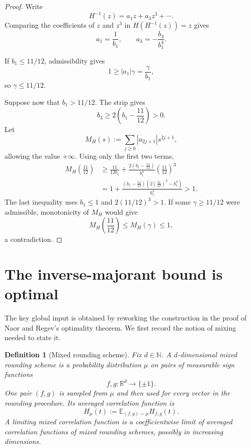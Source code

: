 \documentclass[11pt]{article}
\newtheorem{definition}[theorem]{Definition}
\numberwithin{equation}{section}
\newcommand{\R}{\mathbb R}
\newcommand{\E}{\mathbb E}
\begin{document}
\begin{proof}
Write
\[
        H^{-1}(z)=a_1z+a_3z^3+\cdots.
\]
Comparing the coefficients of $z$ and $z^3$ in $H(H^{-1}(z))=z$ gives
\[
        a_1=\frac1{b_1},
        \qquad
        a_3=-\frac{b_3}{b_1^4}.
\]

If $b_1\le11/12$, admissibility gives
\[
        1\ge |a_1|\gamma=\frac{\gamma}{b_1},
\]
so $\gamma\le11/12$.

Suppose now that $b_1>11/12$. The strip gives
\[
        b_3\ge2\left(b_1-\frac{11}{12}\right)>0.
\]
Let
\[
        M_H(s):=\sum_{j\ge0}|a_{2j+1}|s^{2j+1},
\]
allowing the value $+\infty$. Using only the first two terms,
\begin{align*}
        M_H\left(\frac{11}{12}\right)
        &\ge
        \frac{11}{12b_1}
        +\frac{2(b_1-\frac{11}{12})}{b_1^4}
          \left(\frac{11}{12}\right)^3\\
        &=1+
        \frac{(b_1-\frac{11}{12})
        \left(2(\frac{11}{12})^3-b_1^3\right)}{b_1^4}
        >1.
\end{align*}
The last inequality uses $b_1\le1$ and $2(11/12)^3>1$. If some $\gamma\ge11/12$ were admissible, monotonicity of $M_H$ would give
\[
        M_H\left(\frac{11}{12}\right)\le M_H(\gamma)\le1,
\]
a contradiction.
\end{proof}

\section{The inverse-majorant bound is optimal}
\label{sec:majorant_optimal}

The key global input is obtained by reworking the construction in the proof of Naor and Regev's optimality theorem. We first record the notion of mixing needed to state it.

\begin{definition}[Mixed rounding scheme]\label{def:mixed-rounding}
Fix $d\in\mathbb N$. A $d$-dimensional \emph{mixed rounding scheme} is a probability distribution $\mu$ on pairs of measurable sign functions
\[
        f,g:\R^d\to\{\pm1\}.
\]
One pair $(f,g)$ is sampled from $\mu$ and then used for every vector in the rounding procedure. Its averaged correlation function is
\[
        H_\mu(t):=\E_{(f,g)\sim\mu}H_{f,g}(t).
\]
A \emph{limiting mixed correlation function} is a coefficientwise limit of averaged correlation functions of mixed rounding schemes, possibly in increasing dimensions.
\end{definition}
\end{document}
